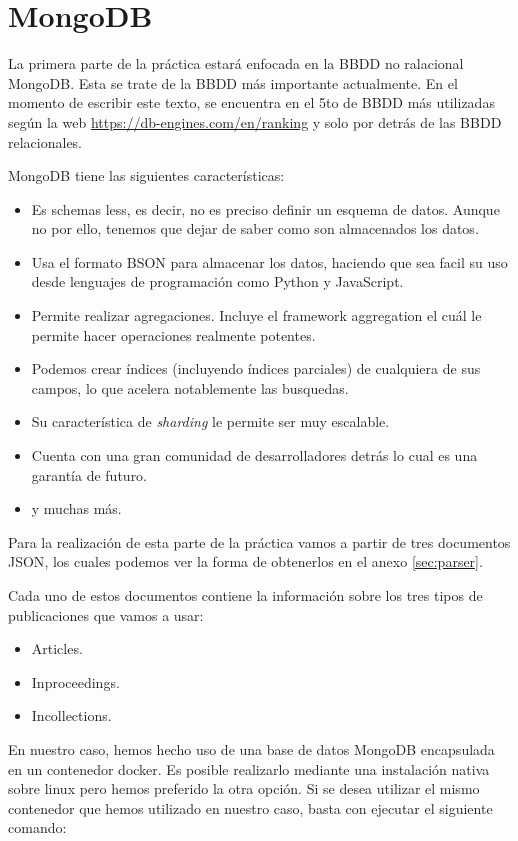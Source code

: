 \section{MongoDB}

La primera parte de la práctica estará enfocada en la \gls{BBDD} no ralacional MongoDB. Esta se trate de la \gls{BBDD} más importante actualmente. En el momento de escribir este texto, se encuentra en el 5to de \gls{BBDD} más utilizadas según la web \url{https://db-engines.com/en/ranking} y solo por detrás de las \gls{BBDD} relacionales.

MongoDB tiene las siguientes características:

\begin{itemize}
 \item Es schemas less, es decir, no es preciso definir un esquema de datos. Aunque no por ello, tenemos que dejar de saber como son almacenados los datos.
 \item Usa el formato BSON para almacenar los datos, haciendo que sea facil su uso desde lenguajes de programación como Python y JavaScript.
 \item Permite realizar agregaciones. Incluye el framework aggregation el cuál le permite hacer operaciones realmente potentes.
 \item Podemos crear índices (incluyendo índices parciales) de cualquiera de sus campos, lo que acelera notablemente las busquedas.
 \item Su característica de \textit{sharding} le permite ser muy escalable.
 \item Cuenta con una gran comunidad de desarrolladores detrás lo cual es una garantía de futuro.
 \item y muchas más.
\end{itemize}

Para la realización de esta parte de la práctica vamos a partir de tres documentos \gls{JSON}, los cuales podemos ver la forma de obtenerlos en el anexo \ref{sec:parser}.

Cada uno de estos documentos contiene la información sobre los tres tipos de publicaciones que vamos a usar:

\begin{itemize}
 \item Articles.
 \item Inproceedings.
 \item Incollections.
\end{itemize}

En nuestro caso, hemos hecho uso de una base de datos MongoDB encapsulada en un contenedor docker. Es posible realizarlo mediante una instalación nativa sobre linux pero hemos preferido la otra opción. Si se desea utilizar el mismo contenedor que hemos utilizado en nuestro caso, basta con ejecutar el siguiente comando:

